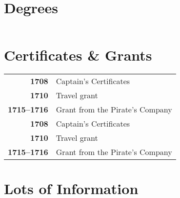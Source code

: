 \documentclass{modernsimplecv}
\newlength{\leftcolwidth}
\begin{document}
\begin{paracol}{2}
{\begin{minipage}[t]{\leftcolwidth}
\vspace{4em}
\end{minipage}

\begin{minipage}[t]{\leftcolwidth}
\section*{Degrees}
\begin{tabular}{r p{} c}
\end{tabular}
\end{minipage}\hfill

\vspace{3em}

\begin{minipage}[t]{\leftcolwidth}
\section*{Certificates \& Grants}
\begin{tabular}{>{\footnotesize\bfseries}r >{\footnotesize}p{}}
    1708 & Captain's Certificates \\
    1710 & Travel grant \\
    1715--1716 & Grant from the Pirate's Company\\
    1708 & Captain's Certificates \\
    1710 & Travel grant \\
    1715--1716 & Grant from the Pirate's Company
\end{tabular}
\bigskip

\end{minipage}\hfill


\vspace{2em}

\begin{minipage}[t]{\leftcolwidth}
\section*{Lots of Information}
\begin{tabular}{r| p{} c}
\end{tabular}


\end{minipage}}
\end{paracol}
\end{document}

